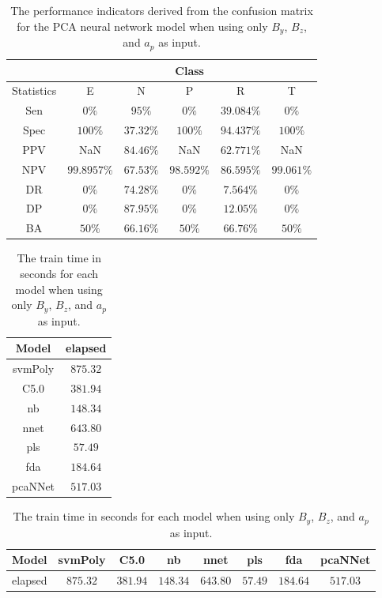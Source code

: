 \begin{table}[!ht]
	\centering
	\begin{tabular}{|c|c|c|c|c|c|}
		\hline
		 & \multicolumn{5}{c|}{Class} \\ \hline
		Statistics & E & N & P & R & T \\ \hline
		Sen & $0\%$ & $95\%$ & $0\%$ & $39.084\%$ & $0\%$ \\ \hline
		Spec & $100\%$ & $37.32\%$ & $100\%$ & $94.437\%$ & $100\%$ \\ \hline
		PPV & NaN & $84.46\%$ & NaN & $62.771\%$ & NaN \\ \hline
		NPV & $99.8957\%$ & $67.53\%$ & $98.592\%$ & $86.595\%$ & $99.061\%$ \\ \hline
		DR & $0\%$ & $74.28\%$ & $0\%$ & $7.564\%$ & $0\%$ \\ \hline
		DP & $0\%$ & $87.95\%$ & $0\%$ & $12.05\%$ & $0\%$ \\ \hline
		BA & $50\%$ & $66.16\%$ & $50\%$ & $66.76\%$ & $50\%$ \\ \hline
	\end{tabular}
	\caption{The performance indicators derived from the confusion matrix for the PCA neural network model when using only $B_{y}$, $B_{z}$, and $a_{p}$ as input.}
	\label{tab:cs:reverse:yzap:pcaNNet}
\end{table}

\begin{table}[!ht]
	\centering
	\begin{tabular}{|c|c|}
		\hline
		Model & elapsed \\ \hline
		svmPoly & $875.32$ \\ \hline
		C5.0 & $381.94$ \\ \hline
		nb & $148.34$ \\ \hline
		nnet & $643.80$ \\ \hline
		pls & $57.49$ \\ \hline
		fda & $184.64$ \\ \hline
		pcaNNet & $517.03$ \\ \hline
	\end{tabular}
	\caption{The train time in seconds for each model when using only $B_{y}$, $B_{z}$, and $a_{p}$ as input.}
	\label{tab:time:yzap:train}
\end{table}

\begin{table}[!ht]
	\centering
	\begin{tabular}{|c|c|c|c|c|c|c|c|}
		\hline
		Model & svmPoly & C5.0 & nb & nnet & pls & fda & pcaNNet \\ \hline
		elapsed & $875.32$ & $381.94$ & $148.34$ & $643.80$ & $57.49$ & $184.64$ & $517.03$ \\ \hline
	\end{tabular}
	\caption{The train time in seconds for each model when using only $B_{y}$, $B_{z}$, and $a_{p}$ as input.}
	\label{tab:time:reverse:yzap:train}
\end{table}

